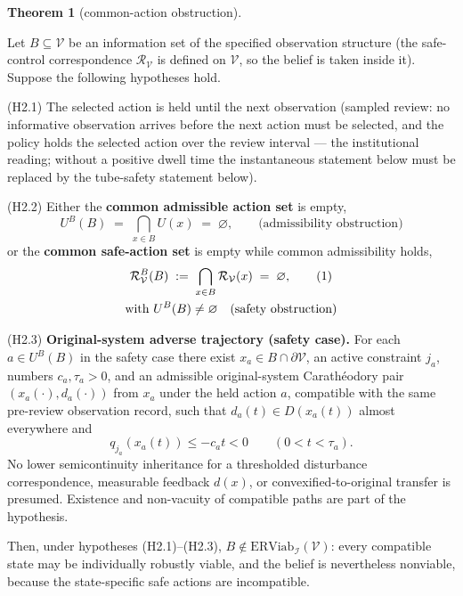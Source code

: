 \documentclass[10pt,twocolumn]{article}
\theoremstyle{definition}
\newtheorem{theorem}{Theorem}
\begin{document}
\begin{theorem}[common-action obstruction]\label{calc-thm:common-action}

Let \(B \subseteq \mathcal{V}\) be an information set of the specified observation structure (the safe-control correspondence
\(\mathcal{R}_{\mathcal{V}}\) is defined on \(\mathcal{V}\), so the
belief is taken inside it). Suppose the following hypotheses hold.

(H2.1) The selected action is held until the next observation (sampled
review: no informative observation arrives before the next action must
be selected, and the policy holds the selected action over the review
interval --- the institutional reading; without a positive dwell time
the instantaneous statement below must be replaced by the tube-safety statement below).

(H2.2) Either the \textbf{common admissible action set} is empty,
\[U^B(B) \;=\; \bigcap_{x \in B} U(x) \;=\; \varnothing, \qquad \text{(admissibility obstruction)}\]
or the \textbf{common safe-action set} is empty while common
admissibility holds,
\begin{gather}
\mathcal{R}_{\mathcal{V}}^B(B) \;:=\; \bigcap_{x \in B} \mathcal{R}_{\mathcal{V}}(x) \;=\; \varnothing, \tag{1}\\
\text{with } U^B(B) \neq \varnothing \quad \text{(safety obstruction)} \notag
\end{gather}

(H2.3) \textbf{Original-system adverse trajectory (safety case).} For each \(a\in U^B(B)\) in the safety case there exist \(x_a\in B\cap\partial\mathcal V\), an active constraint \(j_a\), numbers \(c_a,\tau_a>0\), and an admissible original-system Carath\'eodory pair \((x_a(\cdot),d_a(\cdot))\) from \(x_a\) under the held action \(a\), compatible with the same pre-review observation record, such that \(d_a(t)\in D(x_a(t))\) almost everywhere and
\[q_{j_a}(x_a(t))\le -c_a t<0\qquad(0<t<\tau_a).\]
No lower semicontinuity inheritance for a thresholded disturbance correspondence, measurable feedback \(d(x)\), or convexified-to-original transfer is presumed. Existence and non-vacuity of compatible paths are part of the hypothesis.

Then, under hypotheses (H2.1)--(H2.3),
\(B \notin \mathrm{ERViab}_{\mathcal{I}}(\mathcal{V})\): every
compatible state may be individually robustly viable, and the belief is
nevertheless nonviable, because the state-specific safe actions are
incompatible.

\end{theorem}
\end{document}
